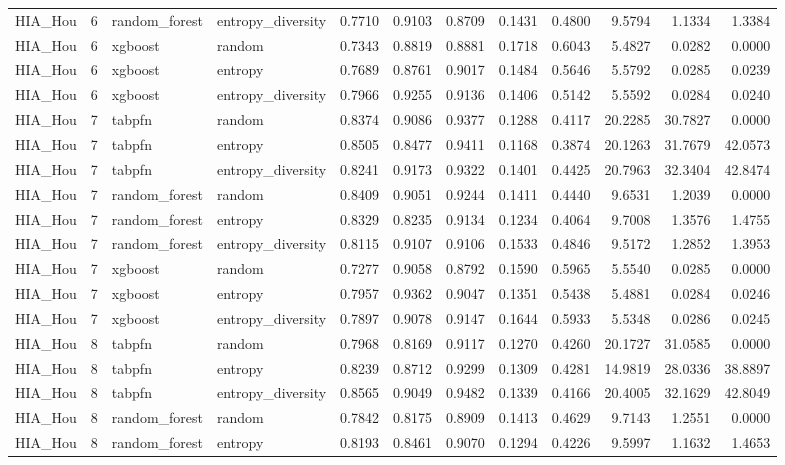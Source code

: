 \begin{tabular}{lrllrrrrrrrr}
HIA_Hou & 6 & random_forest & entropy_diversity & 0.7710 & 0.9103 & 0.8709 & 0.1431 & 0.4800 & 9.5794 & 1.1334 & 1.3384 \\
HIA_Hou & 6 & xgboost & random & 0.7343 & 0.8819 & 0.8881 & 0.1718 & 0.6043 & 5.4827 & 0.0282 & 0.0000 \\
HIA_Hou & 6 & xgboost & entropy & 0.7689 & 0.8761 & 0.9017 & 0.1484 & 0.5646 & 5.5792 & 0.0285 & 0.0239 \\
HIA_Hou & 6 & xgboost & entropy_diversity & 0.7966 & 0.9255 & 0.9136 & 0.1406 & 0.5142 & 5.5592 & 0.0284 & 0.0240 \\
HIA_Hou & 7 & tabpfn & random & 0.8374 & 0.9086 & 0.9377 & 0.1288 & 0.4117 & 20.2285 & 30.7827 & 0.0000 \\
HIA_Hou & 7 & tabpfn & entropy & 0.8505 & 0.8477 & 0.9411 & 0.1168 & 0.3874 & 20.1263 & 31.7679 & 42.0573 \\
HIA_Hou & 7 & tabpfn & entropy_diversity & 0.8241 & 0.9173 & 0.9322 & 0.1401 & 0.4425 & 20.7963 & 32.3404 & 42.8474 \\
HIA_Hou & 7 & random_forest & random & 0.8409 & 0.9051 & 0.9244 & 0.1411 & 0.4440 & 9.6531 & 1.2039 & 0.0000 \\
HIA_Hou & 7 & random_forest & entropy & 0.8329 & 0.8235 & 0.9134 & 0.1234 & 0.4064 & 9.7008 & 1.3576 & 1.4755 \\
HIA_Hou & 7 & random_forest & entropy_diversity & 0.8115 & 0.9107 & 0.9106 & 0.1533 & 0.4846 & 9.5172 & 1.2852 & 1.3953 \\
HIA_Hou & 7 & xgboost & random & 0.7277 & 0.9058 & 0.8792 & 0.1590 & 0.5965 & 5.5540 & 0.0285 & 0.0000 \\
HIA_Hou & 7 & xgboost & entropy & 0.7957 & 0.9362 & 0.9047 & 0.1351 & 0.5438 & 5.4881 & 0.0284 & 0.0246 \\
HIA_Hou & 7 & xgboost & entropy_diversity & 0.7897 & 0.9078 & 0.9147 & 0.1644 & 0.5933 & 5.5348 & 0.0286 & 0.0245 \\
HIA_Hou & 8 & tabpfn & random & 0.7968 & 0.8169 & 0.9117 & 0.1270 & 0.4260 & 20.1727 & 31.0585 & 0.0000 \\
HIA_Hou & 8 & tabpfn & entropy & 0.8239 & 0.8712 & 0.9299 & 0.1309 & 0.4281 & 14.9819 & 28.0336 & 38.8897 \\
HIA_Hou & 8 & tabpfn & entropy_diversity & 0.8565 & 0.9049 & 0.9482 & 0.1339 & 0.4166 & 20.4005 & 32.1629 & 42.8049 \\
HIA_Hou & 8 & random_forest & random & 0.7842 & 0.8175 & 0.8909 & 0.1413 & 0.4629 & 9.7143 & 1.2551 & 0.0000 \\
HIA_Hou & 8 & random_forest & entropy & 0.8193 & 0.8461 & 0.9070 & 0.1294 & 0.4226 & 9.5997 & 1.1632 & 1.4653 \\

\end{tabular}
